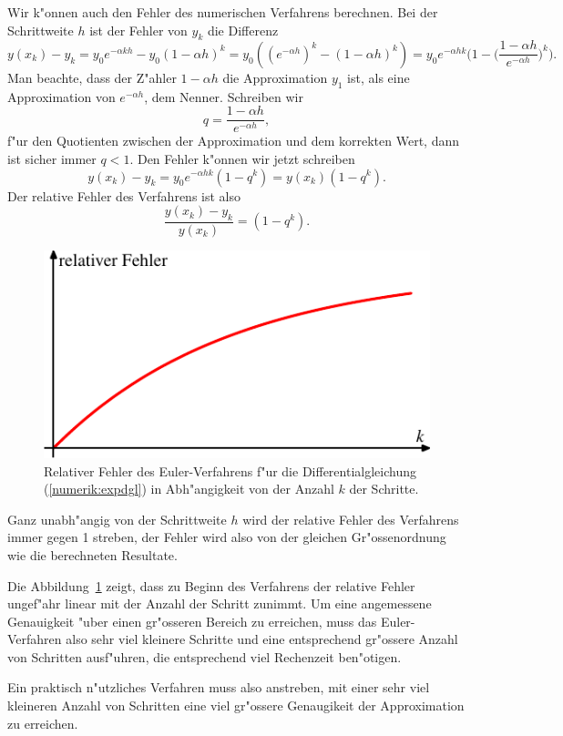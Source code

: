 Wir k"onnen auch den Fehler des numerischen Verfahrens berechnen.
Bei der Schrittweite $h$ ist der Fehler von $y_k$ die Differenz
\[
y(x_k)-y_k
=
y_0e^{-\alpha kh}-y_0(1-\alpha h)^k
=
y_0((e^{-\alpha h})^k - (1-\alpha h)^k)
=
y_0e^{-\alpha hk}\biggl(
1-\biggl(\frac{1-\alpha h}{e^{-\alpha h}}\biggr)^k
\biggr).
\]
Man beachte, dass der Z"ahler $1-\alpha h$ die Approximation
$y_1$ ist, als eine Approximation von $e^{-\alpha h}$, dem Nenner.
Schreiben wir
\[
q=\frac{1-\alpha h}{e^{-\alpha h}},
\]
f"ur den Quotienten zwischen der Approximation und dem korrekten Wert,
dann ist sicher immer $q<1$.
Den Fehler k"onnen wir jetzt schreiben
\[
y(x_k)-y_k = y_0e^{-\alpha hk}(1-q^k) = y(x_k)(1-q^k).
\]
Der relative Fehler des Verfahrens ist also
\[
\frac{y(x_k)-y_k}{y(x_k)}=(1-q^k).
\]
\begin{figure}
\centering
\includegraphics{chapters/images/numerik-3.pdf}
\caption{Relativer Fehler des Euler-Verfahrens f"ur die Differentialgleichung
(\ref{numerik:expdgl}) in Abh"angigkeit von der Anzahl $k$ der Schritte.
\label{numerik:relfehler}}
\end{figure}%
Ganz unabh"angig von der Schrittweite $h$ wird der relative Fehler
des Verfahrens immer gegen 1 streben, der Fehler wird also von der
gleichen Gr"ossenordnung wie die berechneten Resultate.

Die Abbildung~\ref{numerik:relfehler} zeigt, dass zu Beginn des Verfahrens
der relative Fehler ungef"ahr linear mit der Anzahl der Schritt zunimmt.
Um eine angemessene Genauigkeit "uber einen gr"osseren Bereich
zu erreichen, muss das Euler-Verfahren also sehr viel kleinere Schritte
und eine entsprechend gr"ossere Anzahl von Schritten ausf"uhren,
die entsprechend viel Rechenzeit ben"otigen.

Ein praktisch n"utzliches Verfahren muss also anstreben, mit einer
sehr viel kleineren Anzahl von Schritten eine viel gr"ossere Genaugikeit
der Approximation zu erreichen.

